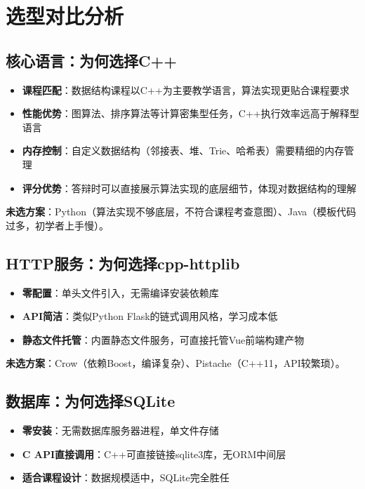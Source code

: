\documentclass[12pt,a4paper]{report}
\begin{document}
\section{选型对比分析}

\subsection{核心语言：为何选择C++}

\begin{itemize}
    \item \textbf{课程匹配}：数据结构课程以C++为主要教学语言，算法实现更贴合课程要求
    \item \textbf{性能优势}：图算法、排序算法等计算密集型任务，C++执行效率远高于解释型语言
    \item \textbf{内存控制}：自定义数据结构（邻接表、堆、Trie、哈希表）需要精细的内存管理
    \item \textbf{评分优势}：答辩时可以直接展示算法实现的底层细节，体现对数据结构的理解
\end{itemize}

\textbf{未选方案}：Python（算法实现不够底层，不符合课程考查意图）、Java（模板代码过多，初学者上手慢）。

\subsection{HTTP服务：为何选择cpp-httplib}

\begin{itemize}
    \item \textbf{零配置}：单头文件引入，无需编译安装依赖库
    \item \textbf{API简洁}：类似Python Flask的链式调用风格，学习成本低
    \item \textbf{静态文件托管}：内置静态文件服务，可直接托管Vue前端构建产物
\end{itemize}

\textbf{未选方案}：Crow（依赖Boost，编译复杂）、Pistache（C++11，API较繁琐）。

\subsection{数据库：为何选择SQLite}

\begin{itemize}
    \item \textbf{零安装}：无需数据库服务器进程，单文件存储
    \item \textbf{C API直接调用}：C++可直接链接sqlite3库，无ORM中间层
    \item \textbf{适合课程设计}：数据规模适中，SQLite完全胜任
\end{itemize}
\end{document}
